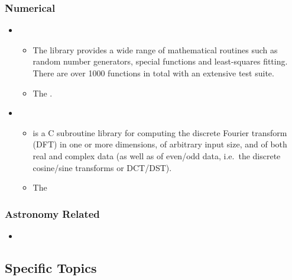 \documentclass[letterpaper,10pt,english]{sphinxmanual}
\begin{document}
\subsubsection{Numerical}
\label{\detokenize{resource/programing/clang_basic:numerical}}\begin{itemize}
\item {} 
\begin{itemize}
\item {} 
The library provides a wide range of mathematical routines such as
random number generators, special functions and least-squares
fitting. There are over 1000 functions in total with an extensive
test suite.

\item {} 
The .

\end{itemize}

\item {} 
\begin{itemize}
\item {} 
 is a C subroutine library for computing the discrete
Fourier transform (DFT) in one or more dimensions, of arbitrary
input size, and of both real and complex data (as well as of
even/odd data, i.e. the discrete cosine/sine transforms or
DCT/DST).

\item {} 
The 

\end{itemize}

\end{itemize}


\subsubsection{Astronomy Related}
\label{\detokenize{resource/programing/clang_basic:astronomy-related}}\begin{itemize}
\item {} 

\end{itemize}


\subsection{Specific Topics}
\label{\detokenize{resource/programing/clang_basic:specific-topics}}
\end{document}
